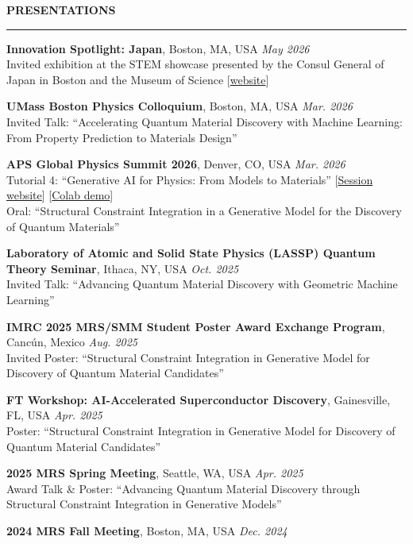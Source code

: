 \documentclass[10pt,a4paper]{article}
\newcommand{\cvsection}[1]{%
  \needspace{3\baselineskip}%
  \vspace{4pt}%
  {\normalsize\bfseries\MakeUppercase{#1}}\par
  \vspace{-6pt}\noindent\rule{\linewidth}{0.6pt}\par
  \vspace{-4pt}}
\begin{document}
\cvsection{Presentations}
\begin{cvenum}
  \item \textbf{Innovation Spotlight: Japan}, Boston, MA, USA \textbar{} \textit{May 2026}\\
    Invited exhibition at the STEM showcase presented by the Consul General of Japan in Boston and the Museum of Science [\href{https://www.mos.org/events/innovation-spotlight-japan}{website}]
  \item \textbf{UMass Boston Physics Colloquium}, Boston, MA, USA \textbar{} \textit{Mar. 2026}\\
    Invited Talk: ``Accelerating Quantum Material Discovery with Machine Learning: From Property Prediction to Materials Design''
  \item \textbf{APS Global Physics Summit 2026}, Denver, CO, USA \textbar{} \textit{Mar. 2026}\\
    Tutorial 4: ``Generative AI for Physics: From Models to Materials'' [\href{https://summit.aps.org/events/MAR-4T}{Session website}] [\href{https://github.com/RyotaroOKabe/APS_demo_SCIGEN}{Colab demo}]\\
    Oral: ``Structural Constraint Integration in a Generative Model for the Discovery of Quantum Materials''
  \item \textbf{Laboratory of Atomic and Solid State Physics (LASSP) Quantum Theory Seminar}, Ithaca, NY, USA \textbar{} \textit{Oct. 2025}\\
    Invited Talk: ``Advancing Quantum Material Discovery with Geometric Machine Learning''
  \item \textbf{IMRC 2025 MRS/SMM Student Poster Award Exchange Program}, Cancún, Mexico \textbar{} \textit{Aug. 2025}\\
    Invited Poster: ``Structural Constraint Integration in Generative Model for Discovery of Quantum Material Candidates''
  \item \textbf{FT Workshop: AI-Accelerated Superconductor Discovery}, Gainesville, FL, USA \textbar{} \textit{Apr. 2025}\\
    Poster: ``Structural Constraint Integration in Generative Model for Discovery of Quantum Material Candidates''
  \item \textbf{2025 MRS Spring Meeting}, Seattle, WA, USA \textbar{} \textit{Apr. 2025}\\
    Award Talk \& Poster: ``Advancing Quantum Material Discovery through Structural Constraint Integration in Generative Models''
  \item \textbf{2024 MRS Fall Meeting}, Boston, MA, USA \textbar{} \textit{Dec. 2024}\\

\end{cvenum}
\end{document}
